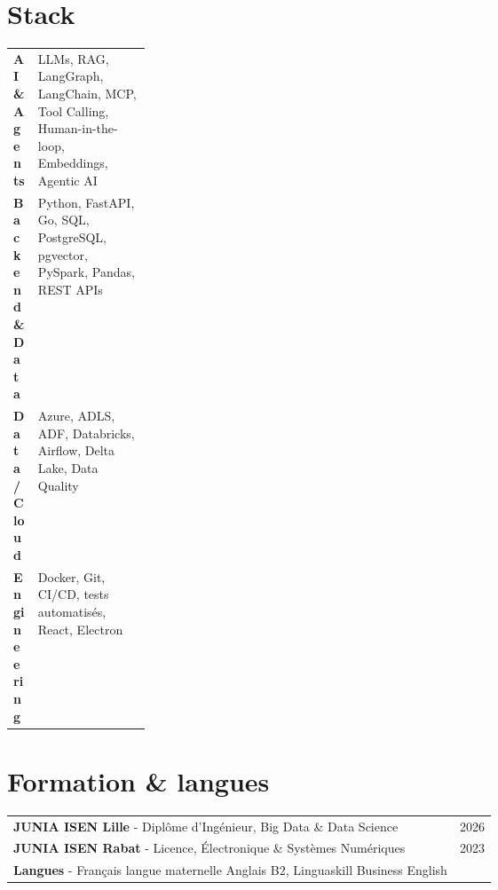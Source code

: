 \documentclass[10pt,a4paper]{article}
\newcommand{\skillrow}[2]{%
  \textbf{#1} & #2\\
}
\begin{document}
\section{Stack}
\begin{tabularx}{\linewidth}{@{}>{\raggedright\arraybackslash}p{0.18\linewidth}>{\raggedright\arraybackslash}X@{}}
\skillrow{AI \& Agents}{LLMs, RAG, LangGraph, LangChain, MCP, Tool Calling, Human-in-the-loop, Embeddings, Agentic AI}
\skillrow{Backend \& Data}{Python, FastAPI, Go, SQL, PostgreSQL, pgvector, PySpark, Pandas, REST APIs}
\skillrow{Data / Cloud}{Azure, ADLS, ADF, Databricks, Airflow, Delta Lake, Data Quality}
\skillrow{Engineering}{Docker, Git, CI/CD, tests automatisés, React, Electron}
\end{tabularx}

\section{Formation \& langues}
\begin{tabularx}{\linewidth}{@{}Xr@{}}
\textbf{JUNIA ISEN Lille} - Diplôme d'Ingénieur, Big Data \& Data Science & 2026\\
\textbf{JUNIA ISEN Rabat} - Licence, Électronique \& Systèmes Numériques & 2023\\
\textbf{Langues} - Français langue maternelle \textbullet{} Anglais B2, Linguaskill Business English &
\end{tabularx}
\end{document}

